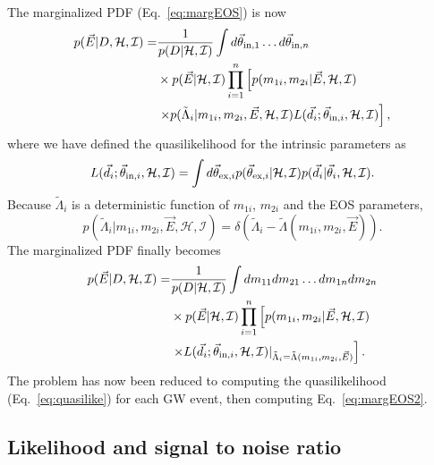 \documentclass[twocolumn,prd,amssymb,aps,nofootinbib,showpacs,epsf]{revtex4}
\begin{document}
The marginalized PDF (Eq.~\eqref{eq:margEOS}) is now
\begin{equation}
\begin{split}
p(\vec E | D,\mathcal{H},\mathcal{I}) = &\frac{1}{p(D | \mathcal{H},\mathcal{I})} 
\int d\vec\theta_{{\rm in,}1} \dots d\vec\theta_{{\rm in,}n} \\
& \times p(\vec E | \mathcal{H},\mathcal{I}) \prod_{i=1}^n \left[p(m_{1i}, m_{2i} | \vec E, \mathcal{H},\mathcal{I}) \right.\\
& \left.\times p(\tilde\Lambda_i | m_{1i}, m_{2i}, \vec E, \mathcal{H},\mathcal{I}) L(\vec d_i; \vec\theta_{{\rm in,}i}, \mathcal{H}, \mathcal{I}) \right],
\end{split}
\end{equation}
where we have defined the quasilikelihood for the intrinsic parameters as
\begin{equation}
\label{eq:quasilike}
L(\vec d_i; \vec\theta_{{\rm in,}i}, \mathcal{H}, \mathcal{I}) = \int d\vec\theta_{{\rm ex},i} p(\vec\theta_{{\rm ex,}i} | \mathcal{H}, \mathcal{I}) p(\vec d_i | \vec\theta_i,\mathcal{H},\mathcal{I}).
\end{equation}
Because $\tilde\Lambda_i$ is a deterministic function of $m_{1i}$, $m_{2i}$ and the EOS parameters,
\begin{equation}
p(\tilde\Lambda_i | m_{1i}, m_{2i}, \vec E, \mathcal{H},\mathcal{I}) = \delta(\tilde\Lambda_i - \tilde\Lambda(m_{1i}, m_{2i}, \vec E)).
\end{equation}
The marginalized PDF finally becomes
\begin{equation}
\label{eq:margEOS2}
\begin{split}
p(\vec E | D,\mathcal{H},\mathcal{I}) =& \frac{1}{p(D | \mathcal{H},\mathcal{I})} \int dm_{11} dm_{21} \dots dm_{1n} dm_{2n} \\
&\times p(\vec E | \mathcal{H},\mathcal{I}) \prod_{i=1}^n \left[ p(m_{1i}, m_{2i} | \vec E, \mathcal{H},\mathcal{I}) \right.\\
& \left. \times L(\vec d_i; \vec\theta_{{\rm in,}i}, \mathcal{H}, \mathcal{I})|_{\tilde\Lambda_i = \tilde\Lambda(m_{1i}, m_{2i}, \vec E)} \right].
\end{split}
\end{equation}
The problem has now been reduced to computing the quasilikelihood (Eq.~\eqref{eq:quasilike}) for each GW event, then computing Eq.~\eqref{eq:margEOS2}.

\subsection{Likelihood and signal to noise ratio}
\end{document}
